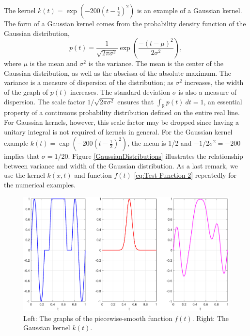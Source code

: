 \documentclass[12pt]{article}
\newcommand{\noiseSD}{\sigma}	%
\begin{document}
The kernel $k(t) = \exp(-200(t-\frac{1}{2})^2)$ is an example of a Gaussian kernel. The form of a Gaussian kernel comes from the probability density function of the Gaussian distribution,
\[p(t) = \frac{1}{\sqrt{2\pi\noiseSD^2}}\exp\left(\frac{-(t-\mu)^2}{2\noiseSD^2}\right),\]
where $\mu$ is the mean and $\noiseSD^2$ is the variance. The mean is the center of the Gaussian distribution, as well as the abscissa of the absolute maximum. The variance is a measure of dispersion of the distribution; as $\noiseSD^2$ increases, the width of the graph of $p(t)$ increases. The standard deviation $\noiseSD$ is also a measure of dispersion. The scale factor $1/\sqrt{2\pi\noiseSD^2}$ ensures that $\int_{\mathbb{R}} p(t) \: dt = 1$, an essential property of a continuous probability distribution defined on the entire real line. For Gaussian kernels, however, this scale factor may be dropped since having a unitary integral is not required of kernels in general.  For the Gaussian kernel example $k(t) = \exp(-200(t-\frac{1}{2})^2)$, the mean is 1/2 and $-1/2\noiseSD^2 = -200$ implies that $\noiseSD = 1/20$. Figure \ref{GaussianDistributions} illustrates the relationship between variance and width of the Gaussian distribution. As a last remark, we use the kernel $k(x,t)$ and function $f(t)$ \eqref{eq:Test Function 2} repeatedly for the numerical examples.

\begin{figure}
	\centerline{\includegraphics[scale=0.4]{Figures/FunctionKernelPlot.eps}}
\caption{Left: The graphs of the piecewise-smooth function $f(t)$. Right: The Gaussian kernel $k(t)$.}
\label{FunctionKernelPlot}
\end{figure}
\end{document}
